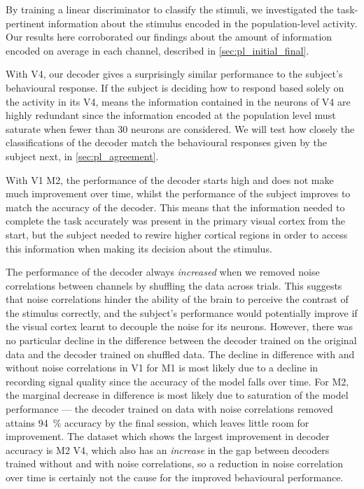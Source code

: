 By training a linear discriminator to classify the stimuli, we investigated the task-pertinent information about the stimulus encoded in the population-level activity.
Our results here corroborated our findings about the amount of information encoded on average in each channel, described in \autoref{sec:pl_initial_final}.

With \ac{V4}, our decoder gives a surprisingly similar performance to the subject's behavioural response.
If the subject is deciding how to respond based solely on the activity in its \ac{V4}, means the information contained in the neurons of \ac{V4} are highly redundant since the information encoded at the population level must saturate when fewer than \num{30} neurons are considered.
We will test how closely the classifications of the decoder match the behavioural responses given by the subject next, in \autoref{sec:pl_agreement}.

With \ac{V1} \ac{M2}, the performance of the decoder starts high and does not make much improvement over time, whilst the performance of the subject improves to match the accuracy of the decoder.
This means that the information needed to complete the task accurately was present in the primary visual cortex from the start, but the subject needed to rewire higher cortical regions in order to access this information when making its decision about the stimulus.

The performance of the decoder always \textit{increased} when we removed noise correlations between channels by shuffling the data across trials.
This suggests that noise correlations hinder the ability of the brain to perceive the contrast of the stimulus correctly, and the subject's performance would potentially improve if the visual cortex learnt to decouple the noise for its neurons.
However, there was no particular decline in the difference between the decoder trained on the original data and the decoder trained on shuffled data.
The decline in difference with and without noise correlations in \ac{V1} for \ac{M1} is most likely due to a decline in recording signal quality since the accuracy of the model falls over time.
For \ac{M2}, the marginal decrease in difference is most likely due to saturation of the model performance --- the decoder trained on data with noise correlations removed attains \SI{94}{\percent} accuracy by the final session, which leaves little room for improvement.
The dataset which shows the largest improvement in decoder accuracy is \ac{M2} \ac{V4}, which also has an \textit{increase} in the gap between decoders trained without and with noise correlations, so a reduction in noise correlation over time is certainly not the cause for the improved behavioural performance.


